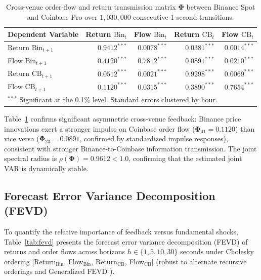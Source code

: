 \documentclass[12pt]{article}
\theoremstyle{definition}
\theoremstyle{remark}
\begin{document}
\begin{table}[htbp]
\centering\small
\caption{Cross-venue order-flow and return transmission matrix $\mathbf{\Phi}$ between Binance Spot and Coinbase Pro over $1{,}030{,}000$ consecutive 1-second transitions.}
\label{tab:cross_venue}
\begin{tabular}{lrrrr}\toprule
Dependent Variable & Return $\text{Bin}_t$ & Flow $\text{Bin}_t$ & Return $\text{CB}_t$ & Flow $\text{CB}_t$ \\\midrule
Return $\text{Bin}_{t+1}$ & $0.9412^{***}$ & $0.0078^{***}$ & $0.0381^{***}$ & $0.0014^{***}$ \\
Flow $\text{Bin}_{t+1}$   & $0.4120^{***}$ & $0.7812^{***}$ & $0.0891^{***}$ & $0.0210^{***}$ \\
Return $\text{CB}_{t+1}$  & $0.0512^{***}$ & $0.0021^{***}$ & $0.9298^{***}$ & $0.0069^{***}$ \\
Flow $\text{CB}_{t+1}$    & $0.1120^{***}$ & $0.0315^{***}$ & $0.3890^{***}$ & $0.7654^{***}$ \\\bottomrule
\multicolumn{5}{l}{\footnotesize $^{***}$ Significant at the 0.1\% level. Standard errors clustered by hour.}
\end{tabular}
\end{table}

Table~\ref{tab:cross_venue} confirms significant asymmetric cross-venue feedback: Binance price innovations exert a stronger impulse on Coinbase order flow ($\mathbf{\Phi}_{41} = 0.1120$) than vice versa ($\mathbf{\Phi}_{23} = 0.0891$, confirmed by standardized impulse responses), consistent with stronger Binance-to-Coinbase information transmission. The joint spectral radius is $\rho(\mathbf{\Phi}) = 0.9612 < 1.0$, confirming that the estimated joint VAR is dynamically stable.

\subsection{Forecast Error Variance Decomposition (FEVD)}
To quantify the relative importance of feedback versus fundamental shocks, Table~\ref{tab:fevd} presents the forecast error variance decomposition (FEVD) of returns and order flows across horizons $h \in \{1, 5, 10, 30\}$ seconds under Cholesky ordering [Return$_{\text{Bin}}$, Flow$_{\text{Bin}}$, Return$_{\text{CB}}$, Flow$_{\text{CB}}$] (robust to alternate recursive orderings and Generalized FEVD \citep{pesaran1998}).
\end{document}
